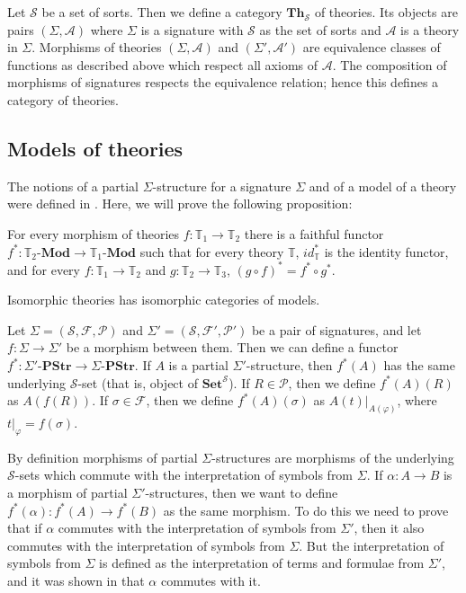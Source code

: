 \documentclass[reqno]{amsart}
\theoremstyle{definition}
\theoremstyle{remark}
\newcommand{\cat}[1]{\mathbf{#1}}
\newcommand{\Set}{\cat{Set}}
\newcommand{\PStr}[1]{#1\text{-}\cat{PStr}}
\newcommand{\Mod}[1]{#1\text{-}\cat{Mod}}
\newcommand{\Th}{\cat{Th}}
\numberwithin{figure}{section}
\begin{document}
Let $\mathcal{S}$ be a set of sorts.
Then we define a category $\Th_\mathcal{S}$ of theories.
Its objects are pairs $(\Sigma,\mathcal{A})$ where $\Sigma$ is a signature with $\mathcal{S}$ as the set of sorts and $\mathcal{A}$ is a theory in $\Sigma$.
Morphisms of theories $(\Sigma,\mathcal{A})$ and $(\Sigma',\mathcal{A}')$
are equivalence classes of functions as described above which respect all axioms of $\mathcal{A}$.
The composition of morphisms of signatures respects the equivalence relation; hence this defines a category of theories.

\subsection{Models of theories}

The notions of a partial $\Sigma$-structure for a signature $\Sigma$ and of a model of a theory were defined in \cite{PHL}.
Here, we will prove the following proposition:

\begin{prop}
For every morphism of theories $f : \mathbb{T}_1 \to \mathbb{T}_2$ there is a faithful functor $f^* : \Mod{\mathbb{T}_2} \to \Mod{\mathbb{T}_1}$ such that
for every theory $\mathbb{T}$, $id_\mathbb{T}^*$ is the identity functor,
and for every $f : \mathbb{T}_1 \to \mathbb{T}_2$ and $g : \mathbb{T}_2 \to \mathbb{T}_3$, $(g \circ f)^* = f^* \circ g^*$.
\end{prop}

\begin{cor}
Isomorphic theories has isomorphic categories of models.
\end{cor}

Let $\Sigma = (\mathcal{S},\mathcal{F},\mathcal{P})$ and $\Sigma' = (\mathcal{S},\mathcal{F}',\mathcal{P}')$ be a pair of signatures,
and let $f : \Sigma \to \Sigma'$ be a morphism between them.
Then we can define a functor $f^* : \PStr{\Sigma'} \to \PStr{\Sigma}$.
If $A$ is a partial $\Sigma'$-structure, then $f^*(A)$ has the same underlying $\mathcal{S}$-set (that is, object of $\Set^\mathcal{S}$).
If $R \in \mathcal{P}$, then we define $f^*(A)(R)$ as $A(f(R))$.
If $\sigma \in \mathcal{F}$, then we define $f^*(A)(\sigma)$ as $A(t)|_{A(\varphi)}$, where $t|_\varphi = f(\sigma)$.

By definition morphisms of partial $\Sigma$-structures are morphisms of the underlying $\mathcal{S}$-sets which commute with the interpretation of symbols from $\Sigma$.
If $\alpha : A \to B$ is a morphism of partial $\Sigma'$-structures, then we want to define $f^*(\alpha) : f^*(A) \to f^*(B)$ as the same morphism.
To do this we need to prove that if $\alpha$ commutes with the interpretation of symbols from $\Sigma'$, then it also commutes with the interpretation of symbols from $\Sigma$.
But the interpretation of symbols from $\Sigma$ is defined as the interpretation of terms and formulae from $\Sigma'$, and it was shown in \cite{PHL} that $\alpha$ commutes with it.
\end{document}
